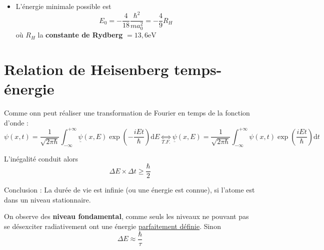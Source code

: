 \begin{itemize}
    \item L'énergie minimale possible est 
      \begin{equation}
        E_0 = - \frac{4}{18} \frac{\hbar ^{2}}{ma_0 ^{2}} = - \frac{4}{9} R_H
      \end{equation}
      où $R_H$ la \textbf{constante de Rydberg} $= 13,6 \mathrm{eV}$
\end{itemize}


\newpage
\section{Relation de Heisenberg temps-énergie} %
\label{sec:Relation de Heisenberg temps-énergie}

Comme onn peut réaliser une transformation de Fourier en temps de la fonction d'onde : 
\begin{equation}
  \psi(x,t) = \frac{1}{\sqrt{2 \pi \hbar}}  \int_{- \infty}^{+ \infty} \underline{\psi}(x,E) \exp \left( - \frac{iEt}{\hbar}  \right) \mathrm{d}E \underset{T.F.}{\iff}
\underline{\psi}(x,E) = \frac{1}{\sqrt{2 \pi \hbar}}  \int_{- \infty}^{+ \infty}  \psi    (x,t) \exp \left(  \frac{iEt}{\hbar}  \right) \mathrm{d}t \end{equation}

L'inégalité conduit alors 
\begin{equation}
  \Delta E \times \Delta t \ge \frac{\hbar}{2} 
\end{equation}

Conclusion : La durée de vie est infinie (ou une énergie est connue), si l'atome est dans un niveau stationnaire.

On observe des \textbf{niveau fondamental}, comme seuls les niveaux ne pouvant pas se désexciter radiativement ont une énergie \underline{parfaitement définie}. Sinon 
\begin{equation}
  \Delta E \approx \frac{\hbar}{\tau} 
\end{equation}

